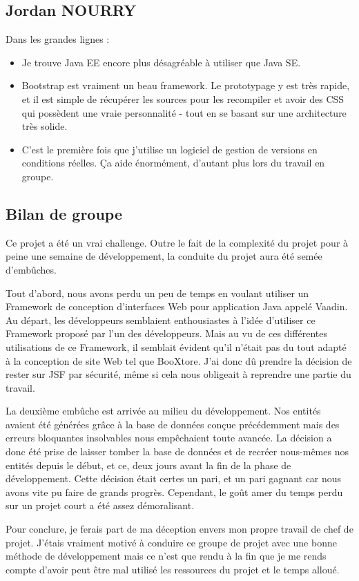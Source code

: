\subsection{Jordan NOURRY}
Dans les grandes lignes :
	\begin{itemize}
		\item Je trouve Java EE encore plus désagréable à utiliser que Java SE.
		\item Bootstrap est vraiment un beau framework. Le prototypage y est très rapide, et il est simple de récupérer les sources pour les recompiler et avoir des CSS qui possèdent une vraie personnalité - tout en se basant sur une architecture très solide.
		\item C'est le première fois que j'utilise un logiciel de gestion de versions en conditions réelles. Ça aide énormément, d'autant plus lors du travail en groupe.
	\end{itemize}

\subsection{Bilan de groupe}
Ce projet a été un vrai challenge. Outre le fait de la complexité du projet pour à peine une semaine de développement, la conduite du projet aura été semée d’embûches.

Tout d’abord, nous avons perdu un peu de temps en voulant utiliser un Framework de conception d’interfaces Web pour application Java appelé Vaadin. Au départ, les développeurs semblaient enthousiastes à l’idée d’utiliser ce Framework proposé par l’un des développeurs. Mais au vu de ces différentes utilisations de ce Framework, il semblait évident qu’il n’était pas du tout adapté à la conception de site Web tel que BooXtore. J’ai donc dû prendre la décision de rester sur JSF par sécurité, même si cela nous obligeait à reprendre une partie du travail.

La deuxième embûche est arrivée au milieu du développement. Nos entités avaient été générées grâce à la base de données conçue précédemment mais des erreurs bloquantes insolvables nous empêchaient toute avancée. La décision a donc été prise de laisser tomber la base de données et de recréer nous-mêmes nos entités depuis le début, et ce, deux jours avant la fin de la phase de développement. Cette décision était certes un pari, et un pari gagnant car nous avons vite pu faire de grands progrès. Cependant, le goût amer du temps perdu sur un projet court a été assez démoralisant.

Pour conclure, je ferais part de ma déception envers mon propre travail de chef de projet. J’étais vraiment motivé à conduire ce groupe de projet avec une bonne méthode de développement mais ce n’est que rendu à la fin que je me rends compte d’avoir peut être mal utilisé les ressources du projet et le temps alloué.

